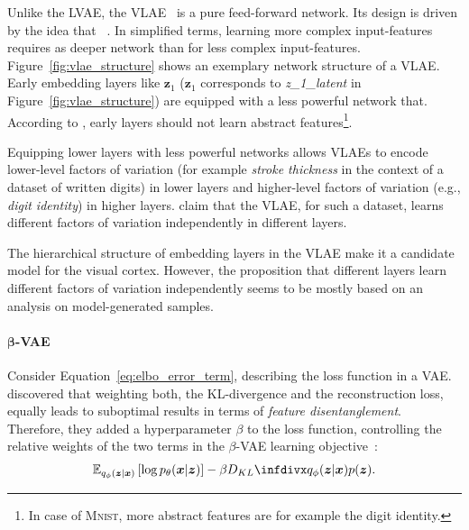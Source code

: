 Unlike the \ac{LVAE}, the \ac{VLAE}~\citep{zhao2017learning} is a pure feed-forward network.
Its design is driven by the idea that ~\citep{zhao2017learning}.
In simplified terms, learning more complex input-features requires as deeper network than for less complex input-features.
Figure~\ref{fig:vlae_structure} shows an exemplary network structure of a \ac{VLAE}.
Early embedding layers like $\bm{z}_1$ ($\bm{z}_1$ corresponds to \textit{z\_1\_latent} in Figure~\ref{fig:vlae_structure}) are equipped with a less powerful network that.
According to \citet{zhao2017learning}, early layers should not learn abstract features\footnote{In case of \textsc{Mnist}, more abstract features are for example the digit identity.}.

Equipping lower layers with less powerful networks allows \acp{VLAE} to encode lower-level factors of variation (for example \textit{stroke thickness} in the context of a dataset of written digits) in lower layers and higher-level factors of variation (e.g., \textit{digit identity}) in higher layers.
\citet{zhao2017learning} claim that the \ac{VLAE}, for such a dataset, learns different factors of variation independently in different layers.

The hierarchical structure of embedding layers in the \ac{VLAE} make it a candidate model for the visual cortex.
However, the proposition that different layers learn different factors of variation independently seems to be mostly based on an analysis on model-generated samples.

\paragraph{$\bm{\beta}$-VAE}

Consider Equation~\ref{eq:elbo_error_term}, describing the loss function in a \ac{VAE}.
\citet{higgins2017beta} discovered that weighting both, the KL-divergence and the reconstruction loss, equally leads to suboptimal results in terms of \textit{feature disentanglement}.
Therefore, they added a hyperparameter $\beta$ to the loss function, controlling the relative weights of the two terms in the $\beta$-\ac{VAE} learning objective~\citep{higgins2017beta}:
\begin{align}
    \mathbb{E}_{q_{\phi}(\bm{z} | \bm{x})}\left[\log p_{\theta}(\bm{x} | \bm{z})\right]-\beta \kldiv{q_{\phi}(\bm{z} | \bm{x})}{p(\bm{z})}. \label{eq:beta-vae}
\end{align}

